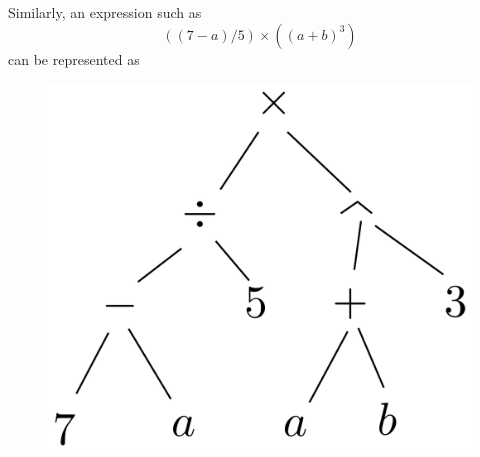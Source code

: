\documentclass[11pt]{article}
\begin{document}
    Similarly, an expression such as \[((7-a)/5)\times((a+b)^3)\] can be represented as 
    \begin{figure}[H]
        \centering
        \includegraphics[scale=0.1]{finalex.png}
    \end{figure}
\end{document}
